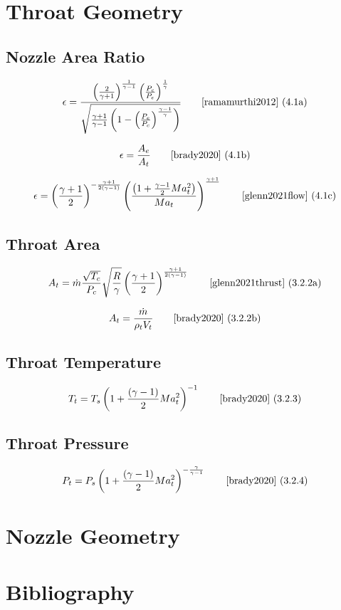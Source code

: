 \documentclass{article}
\newcommand{\eqcite}[3]{\begin{equation}#1\tag*{\text{\cite{#3}~(#2)}}\end{equation}}
\begin{document}
\pagebreak
\section{Throat Geometry}

\subsection[Nozzle Area Ratio]{Nozzle Area Ratio}

\eqcite{\epsilon = \frac{\left(\frac{2}{\gamma+1}\right)^\frac{1}{\gamma-1}\left(\frac{P_c}{P_e}\right)^\frac{1}{\gamma}}{\sqrt{\frac{\gamma+1}{\gamma-1}\left(1-\left(\frac{P_e}{P_c}\right)^\frac{\gamma-1}{\gamma}\right)}}}{4.1a}{ramamurthi2012}

\eqcite{\epsilon = \frac{A_e}{A_t}}{4.1b}{brady2020}

\eqcite{\epsilon = \left(\frac{\gamma+1}{2}\right)^{-\frac{\gamma+1}{2\left(\gamma-1\right)}}\left(\frac{\left(1+\frac{\gamma-1}{2}Ma_t^2\right)}{Ma_t}\right)^{\frac{\gamma+1}{}}}{4.1c}{glenn2021flow}

\subsection[Throat Area]{Throat Area}

\eqcite{A_t = \dot{m} \frac{\sqrt{T_c}}{P_c} \sqrt{\frac{R}{\gamma}} \left(\frac{\gamma+1}{2}\right)^\frac{\gamma+1}{2\left(\gamma-1\right)}}{3.2.2a}{glenn2021thrust}

\eqcite{A_t = \frac{\dot{m}}{\rho_t V_t}}{3.2.2b}{brady2020}

\subsection{Throat Temperature}

\eqcite{T_t = T_s \left( 1 + \frac{\left(\gamma-1\right)}{2} Ma_t^2\right)^{-1}}{3.2.3}{brady2020}

\subsection{Throat Pressure}

\eqcite{P_t = P_s \left( 1 + \frac{\left(\gamma-1\right)}{2}Ma_t^2\right)^{-\frac{\gamma}{\gamma-1}}}{3.2.4}{brady2020}

\pagebreak
\section{Nozzle Geometry}



\pagebreak
\section*{Bibliography}


\end{document}
